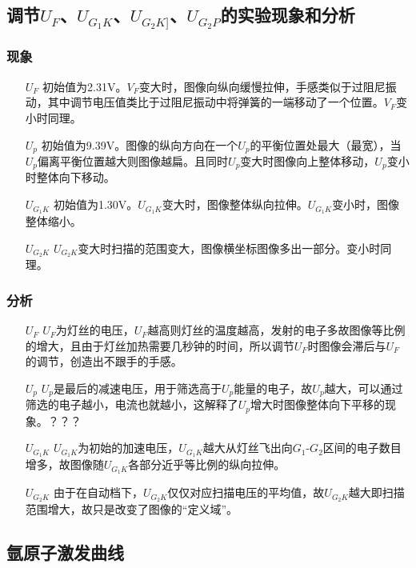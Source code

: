 \documentclass[UEF8]{ctexart}
\begin{document}
\begin{multicols}{2}
\subsection{调节$U_{F}$、$U_{G_{1}K}$、$U_{G_{2}K]}$、$U_{G_{2}P}$的实验现象和分析}
\subsubsection{现象}
\begin{enumerate}
	\item[$U_{F}$] 初始值为2.31V。$V_{F}$变大时，图像向纵向缓慢拉伸，手感类似于过阻尼振动，其中调节电压值类比于过阻尼振动中将弹簧的一端移动了一个位置。$V_{F}$变小时同理。
	\item[$U_{p}$] 初始值为9.39V。图像的纵向方向在一个$U_{p}$的平衡位置处最大（最宽），当$U_{p}$偏离平衡位置越大则图像越扁。且同时$U_{p}$变大时图像向上整体移动，$U_{p}$变小时整体向下移动。
	\item[$U_{G_{1}K}$] 初始值为1.30V。$U_{G_{1}K}$变大时，图像整体纵向拉伸。$U_{G_{1}K}$变小时，图像整体缩小。
	\item[$U_{G_{2}K}$] $U_{G_{2}K}$变大时扫描的范围变大，图像横坐标图像多出一部分。变小时同理。
\end{enumerate}

\subsubsection{分析}
\begin{enumerate}
	\item[$U_{F}$] $U_{F}$为灯丝的电压，$U_{F}$越高则灯丝的温度越高，发射的电子多故图像等比例的增大，且由于灯丝加热需要几秒钟的时间，所以调节$U_{F}$时图像会滞后与$U_{F}$的调节，创造出不跟手的手感。
	\item[$U_{p}$] $U_{p}$是最后的减速电压，用于筛选高于$U_{p}$能量的电子，故$U_{p}$越大，可以通过筛选的电子越小，电流也就越小，这解释了$U_{p}$增大时图像整体向下平移的现象。？？？
	\item[$U_{G_{1}K}$] $U_{G_{1}K}$为初始的加速电压，$U_{G_{1}K}$越大从灯丝飞出向$G_{1}$-$G_{2}$区间的电子数目增多，故图像随$U_{G_{1}K}$各部分近乎等比例的纵向拉伸。
	\item[$U_{G_{2}K}$] 由于在自动档下，$U_{G_{2}K}$仅仅对应扫描电压的平均值，故$U_{G_{2}K}$越大即扫描范围增大，故只是改变了图像的“定义域”。
\end{enumerate}

\subsection{氩原子激发曲线}

\end{multicols}
\end{document}
